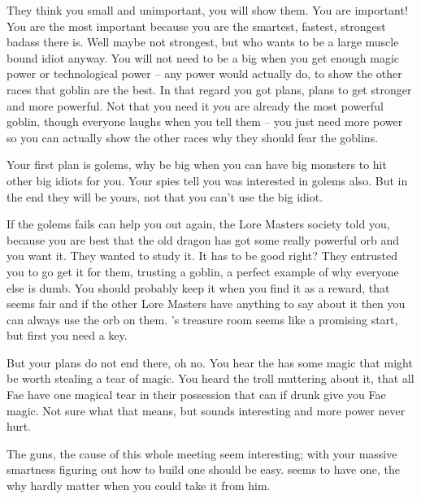 \documentclass[char]{guildcamp2}
\begin{document}
\name{\cGoblin{}}




They think you small and unimportant, you will show them. You are important! You are the most important because you are the smartest, fastest, strongest badass there is. Well maybe not strongest, but who wants to be a large muscle bound idiot anyway. You will not need to be a big when you get enough magic power or technological power -- any power would actually do, to show the other races that goblin are the best. In that regard you got plans, plans to get stronger and more powerful.  Not that you need it you are already the most powerful goblin, though everyone laughs when you tell them -- you just need more power so you can actually show the other races why they should fear the goblins. 

Your first plan is golems, why be big when you can have big monsters to hit other big idiots for you. Your spies tell you \cOnyx{} was interested in golems also. But in the end they will be yours, not that you can't use the big idiot.

If the golems fails \cOnyx{} can help you out again, the Lore Masters society told you, because you are best that the old dragon has got some really powerful orb and you want it. They wanted to study it. It has to be good right? They entrusted you to go get it for them, trusting a goblin, a perfect example of why everyone else is dumb. You should probably keep it when you find it as a reward, that seems fair and if the other Lore Masters have anything to say about it then you can always use the orb on them. \cOnyx{}'s treasure room seems like a promising start, but first you need a key.  

But your plans do not end there, oh no. You hear the \cTreeFae{} has some magic that might be worth stealing a tear of magic. You heard the troll muttering about it, that all Fae have one magical tear in their possession that can if drunk give you Fae magic. Not sure what that means, but sounds interesting and more power never hurt.

The guns, the cause of this whole meeting seem interesting; with your massive smartness figuring out how to build one should be easy. \cCleric{} seems to have one, the why hardly matter when you could take it from him. 
\end{document}
